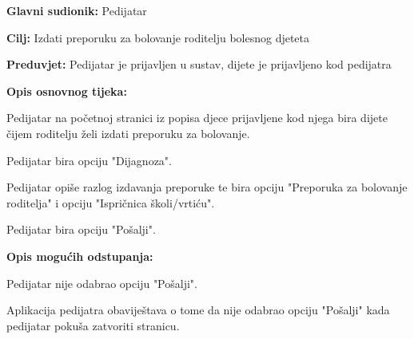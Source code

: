 					
					\noindent {}
					\begin{packed_item}
						
						\item \textbf{Glavni sudionik: }Pedijatar
						\item  \textbf{Cilj:} Izdati preporuku za bolovanje roditelju bolesnog djeteta
						\item  \textbf{Preduvjet:} Pedijatar je prijavljen u sustav, dijete je prijavljeno kod pedijatra
						\item  \textbf{Opis osnovnog tijeka:}
						
						\item[] \begin{packed_enum}
							
							\item Pedijatar na početnoj stranici iz popisa djece prijavljene kod njega bira dijete čijem roditelju želi izdati preporuku za bolovanje.
							\item Pedijatar bira opciju "Dijagnoza".
							\item Pedijatar opiše razlog izdavanja preporuke te bira opciju "Preporuka za bolovanje roditelja" i opciju "Ispričnica školi/vrtiću".
							\item Pedijatar bira opciju "Pošalji".
						\end{packed_enum}
						
						\item  \textbf{Opis mogućih odstupanja:}
						
						\item[] \begin{packed_item}
							
							\item[4.a] Pedijatar nije odabrao opciju "Pošalji".
							\item[] \begin{packed_enum}
								
								\item Aplikacija pedijatra obaviještava o tome da nije odabrao opciju "Pošalji" kada pedijatar pokuša zatvoriti stranicu.
							\end{packed_enum}
							
							
						\end{packed_item}
						
						
					\end{packed_item}
					

